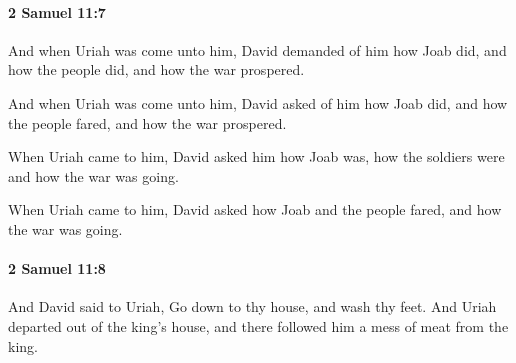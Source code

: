 		\paragraph{2 Samuel 11:7} %
			\label{2SAMUEL-11-7}

			And when Uriah was come unto him, David demanded of him how Joab did, and how the people did, and how the war prospered.

			\begin{versebox}
					\item[BHS] 
					\item[ASV] And when Uriah was come unto him, David asked of him how Joab did, and how the people fared, and how the war prospered.
					\item[NIV] When Uriah came to him, David asked him how Joab was, how the soldiers were and how the war was going.
					\item[NRSV] When Uriah came to him, David asked how Joab and the people fared, and how the war was going.
			\end{versebox}

		\paragraph{2 Samuel 11:8} %
			\label{2SAMUEL-11-8}

			And David said to Uriah, Go down to thy house, and wash thy feet. And Uriah departed out of the king’s house, and there followed him a mess of meat from the king.


